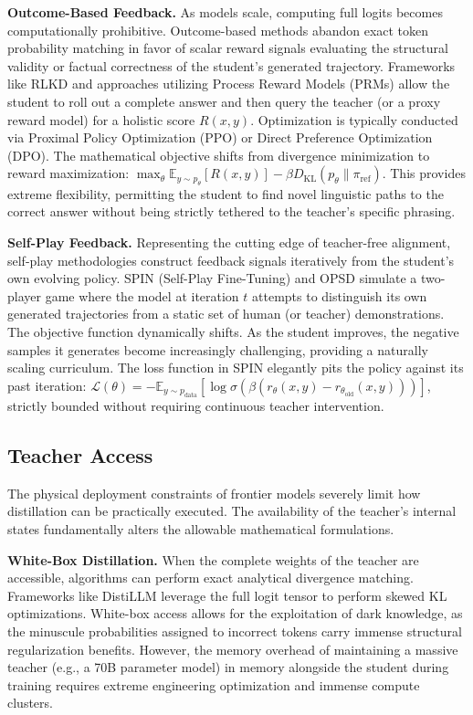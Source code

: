\documentclass{article} %
\newcommand{\KL}{D_{\mathrm{KL}}}
\newcommand{\ptheta}{p_\theta}
\newcommand{\pdata}{p_{\mathrm{data}}}
\newcommand{\loss}{\mathcal{L}}
\begin{document}
\textbf{Outcome-Based Feedback.} As models scale, computing full logits becomes computationally prohibitive. Outcome-based methods abandon exact token probability matching in favor of scalar reward signals evaluating the structural validity or factual correctness of the student's generated trajectory. Frameworks like RLKD \citep{2505.16142} and approaches utilizing Process Reward Models (PRMs) \citep{2305.20050} allow the student to roll out a complete answer and then query the teacher (or a proxy reward model) for a holistic score $R(x, y)$. Optimization is typically conducted via Proximal Policy Optimization (PPO) or Direct Preference Optimization (DPO). The mathematical objective shifts from divergence minimization to reward maximization: $\max_\theta \mathbb{E}_{y \sim \ptheta} [R(x, y)] - \beta \KL(\ptheta \parallel \pi_{\mathrm{ref}})$. This provides extreme flexibility, permitting the student to find novel linguistic paths to the correct answer without being strictly tethered to the teacher's specific phrasing.

\textbf{Self-Play Feedback.} Representing the cutting edge of teacher-free alignment, self-play methodologies construct feedback signals iteratively from the student's own evolving policy. SPIN (Self-Play Fine-Tuning) \citep{2401.01335} and OPSD \citep{2601.18734} simulate a two-player game where the model at iteration $t$ attempts to distinguish its own generated trajectories from a static set of human (or teacher) demonstrations. The objective function dynamically shifts. As the student improves, the negative samples it generates become increasingly challenging, providing a naturally scaling curriculum. The loss function in SPIN elegantly pits the policy against its past iteration: $\loss(\theta) = -\mathbb{E}_{y \sim \pdata} [\log \sigma(\beta(r_\theta(x,y) - r_{\theta_{\mathrm{old}}}(x,y)))]$, strictly bounded without requiring continuous teacher intervention.

\subsection{Teacher Access}
\label{subsec:tax_access}

The physical deployment constraints of frontier models severely limit how distillation can be practically executed. The availability of the teacher's internal states fundamentally alters the allowable mathematical formulations.

\textbf{White-Box Distillation.} When the complete weights of the teacher are accessible, algorithms can perform exact analytical divergence matching. Frameworks like DistiLLM \citep{2402.03898} leverage the full logit tensor to perform skewed KL optimizations. White-box access allows for the exploitation of dark knowledge, as the minuscule probabilities assigned to incorrect tokens carry immense structural regularization benefits. However, the memory overhead of maintaining a massive teacher (e.g., a 70B parameter model) in memory alongside the student during training requires extreme engineering optimization and immense compute clusters.
\end{document}
